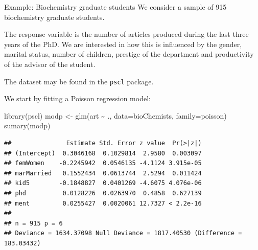 \documentclass[
  ignorenonframetext,
]{beamer}
\newenvironment{Shaded}{\begin{snugshade}}{\end{snugshade}}
\newcommand{\AttributeTok}[1]{\textcolor[rgb]{0.77,0.63,0.00}{#1}}
\newcommand{\FunctionTok}[1]{\textcolor[rgb]{0.00,0.00,0.00}{#1}}
\newcommand{\NormalTok}[1]{#1}
\newcommand{\OtherTok}[1]{\textcolor[rgb]{0.56,0.35,0.01}{#1}}
\newcommand{\SpecialCharTok}[1]{\textcolor[rgb]{0.00,0.00,0.00}{#1}}
\begin{document}
\begin{frame}{Example: Biochemistry graduate students}
\protect\hypertarget{example-biochemistry-graduate-students}{}
We consider a sample of 915 biochemistry graduate students.

\vspace{12pt}

The response variable is the number of articles produced during the last
three years of the PhD. \vspace{12pt} We are interested in how this is
influenced by the gender, marital status, number of children, prestige
of the department and productivity of the advisor of the student.

\vspace{12pt}

The dataset may be found in the \texttt{pscl} package.
\end{frame}

\begin{frame}[fragile]{}
\protect\hypertarget{section-28}{}
We start by fitting a Poisson regression model:

\vspace{12pt}
\tiny

\begin{Shaded}
\begin{Highlighting}[]
\FunctionTok{library}\NormalTok{(pscl)}
\NormalTok{modp }\OtherTok{\textless{}{-}} \FunctionTok{glm}\NormalTok{(art }\SpecialCharTok{\textasciitilde{}}\NormalTok{ ., }\AttributeTok{data=}\NormalTok{bioChemists, }\AttributeTok{family=}\NormalTok{poisson)}
\FunctionTok{sumary}\NormalTok{(modp)}
\end{Highlighting}
\end{Shaded}

\begin{verbatim}
##               Estimate Std. Error z value  Pr(>|z|)
## (Intercept)  0.3046168  0.1029814  2.9580  0.003097
## femWomen    -0.2245942  0.0546135 -4.1124 3.915e-05
## marMarried   0.1552434  0.0613744  2.5294  0.011424
## kid5        -0.1848827  0.0401269 -4.6075 4.076e-06
## phd          0.0128226  0.0263970  0.4858  0.627139
## ment         0.0255427  0.0020061 12.7327 < 2.2e-16
## 
## n = 915 p = 6
## Deviance = 1634.37098 Null Deviance = 1817.40530 (Difference = 183.03432)
\end{verbatim}
\end{frame}
\end{document}
